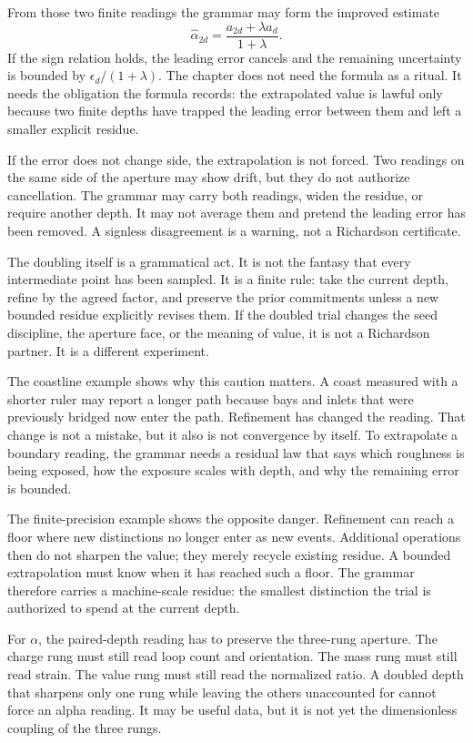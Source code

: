 From those two finite readings the grammar may form the improved estimate
\[
  \widehat{\alpha}_{2d}
    = \frac{a_{2d}+\lambda a_d}{1+\lambda}.
\]
If the sign relation holds, the leading error cancels and the remaining
uncertainty is bounded by \(\epsilon_d/(1+\lambda)\). The chapter does not
need the formula as a ritual. It needs the obligation the formula records:
the extrapolated value is lawful only because two finite depths have trapped
the leading error between them and left a smaller explicit residue.

If the error does not change side, the extrapolation is not forced. Two
readings on the same side of the aperture may show drift, but they do not
authorize cancellation. The grammar may carry both readings, widen the
residue, or require another depth. It may not average them and pretend the
leading error has been removed. A signless disagreement is a warning, not a
Richardson certificate.

The doubling itself is a grammatical act. It is not the fantasy that every
intermediate point has been sampled. It is a finite rule: take the current
depth, refine by the agreed factor, and preserve the prior commitments unless
a new bounded residue explicitly revises them. If the doubled trial changes
the seed discipline, the aperture face, or the meaning of value, it is not a
Richardson partner. It is a different experiment.

The coastline example shows why this caution matters. A coast measured with
a shorter ruler may report a longer path because bays and inlets that were
previously bridged now enter the path. Refinement has changed the reading.
That change is not a mistake, but it also is not convergence by itself. To
extrapolate a boundary reading, the grammar needs a residual law that says
which roughness is being exposed, how the exposure scales with depth, and
why the remaining error is bounded.

The finite-precision example shows the opposite danger. Refinement can reach
a floor where new distinctions no longer enter as new events. Additional
operations then do not sharpen the value; they merely recycle existing
residue. A bounded extrapolation must know when it has reached such a floor.
The grammar therefore carries a machine-scale residue: the smallest
distinction the trial is authorized to spend at the current depth.

For \(\alpha\), the paired-depth reading has to preserve the three-rung
aperture. The charge rung must still read loop count and orientation. The
mass rung must still read strain. The value rung must still read the
normalized ratio. A doubled depth that sharpens only one rung while leaving
the others unaccounted for cannot force an alpha reading. It may be useful
data, but it is not yet the dimensionless coupling of the three rungs.


